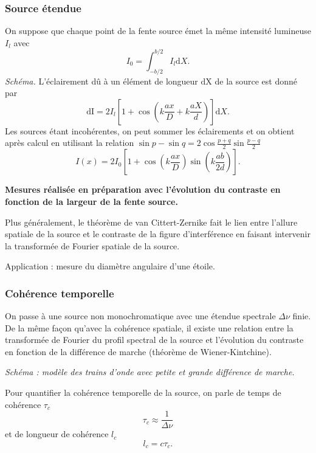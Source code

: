 \subsubsection{Source étendue}

On suppose que chaque point de la fente source émet la même intensité lumineuse $I_l$ avec
\begin{equation}
I_0 = \int_{-b/2}^{b/2} I_l \mathrm{d}X.
\end{equation}
\emph{Schéma.}
L'éclairement dû à un élément de longueur $\mathrm{dX}$ de la source est donné par
\begin{equation}
\mathrm{dI} = 2I_l\left[1+\cos\left(k\frac{ax}{D}+k\frac{aX}{d}\right)\right]\mathrm{d}X.
\end{equation}
Les sources étant incohérentes, on peut sommer les éclairements et on obtient après calcul en utilisant la relation $\sin p - \sin q = 2\cos\frac{p+q}{2}\sin\frac{p-q}{2}$
\begin{equation}
I(x) = 2I_0\left[1+\cos\left(k\frac{ax}{D}\right)\sin\left(k\frac{ab}{2d}\right)\right].
\end{equation}

\begin{slide}
\textbf{Mesures réalisée en préparation avec l'évolution du contraste en fonction de la largeur de la fente source.}
\end{slide}

Plus généralement, le théorème de van Cittert-Zernike fait le lien entre l'allure spatiale de la source et le contraste de la figure d'interférence en faisant intervenir la transformée de Fourier spatiale de la source.

Application : mesure du diamètre angulaire d'une étoile.

\subsubsection{Cohérence temporelle}

On passe à une source non monochromatique avec une étendue spectrale $\Delta\nu$ finie.
De la même façon qu'avec la cohérence spatiale, il existe une relation entre la transformée de Fourier du profil spectral de la source et l'évolution du contraste en fonction de la différence de marche (théorème de Wiener-Kintchine).

\emph{Schéma : modèle des trains d'onde avec petite et grande différence de marche.}

Pour quantifier la cohérence temporelle de la source, on parle de temps de cohérence $\tau_c$
\begin{equation}
\tau_c \approx \frac{1}{\Delta\nu}
\end{equation}
et de longueur de cohérence $l_c$
\begin{equation}
l_c = c\tau_c.
\end{equation}

